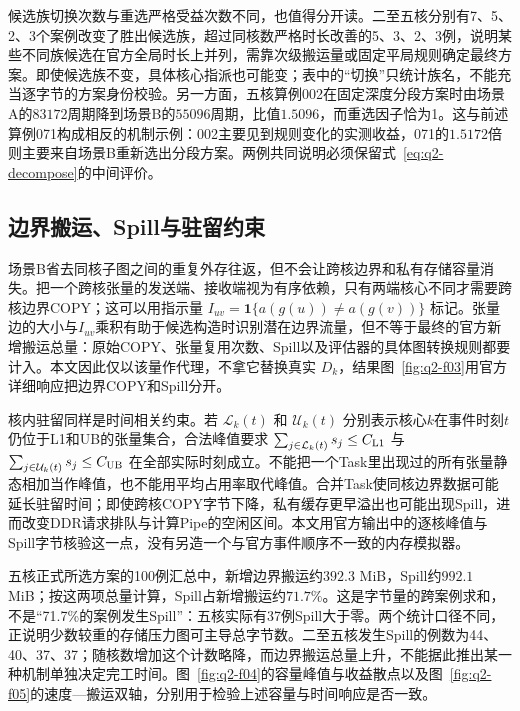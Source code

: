

候选族切换次数与重选严格受益次数不同，也值得分开读。二至五核分别有7、5、2、3个案例改变了胜出候选族，超过同核数严格时长改善的5、3、2、3例，说明某些不同族候选在官方全局时长上并列，需靠次级搬运量或固定平局规则确定最终方案。即使候选族不变，具体核心指派也可能变；表中的“切换”只统计族名，不能充当逐字节的方案身份校验。另一方面，五核算例002在固定深度分段方案时由场景A的$83172$周期降到场景B的$55096$周期，比值$1.5096$，而重选因子恰为1。这与前述算例071构成相反的机制示例：002主要见到规则变化的实测收益，071的$1.5172$倍则主要来自场景B重新选出分段方案。两例共同说明必须保留式~\eqref{eq:q2-decompose}的中间评价。

\subsection{边界搬运、Spill与驻留约束}

场景B省去同核子图之间的重复外存往返，但不会让跨核边界和私有存储容量消失。把一个跨核张量的发送端、接收端视为有序依赖，只有两端核心不同才需要跨核边界COPY；这可以用指示量 $I_{uv}=\mathbf 1\{a(g(u))\ne a(g(v))\}$ 标记。张量边的大小与$I_{uv}$乘积有助于候选构造时识别潜在边界流量，但不等于最终的官方新增搬运总量：原始COPY、张量复用次数、Spill以及评估器的具体图转换规则都要计入。本文因此仅以该量作代理，不拿它替换真实 $D_k$，结果图~\ref{fig:q2-f03}用官方详细响应把边界COPY和Spill分开。

核内驻留同样是时间相关约束。若 $\mathcal L_k(t)$ 和 $\mathcal U_k(t)$ 分别表示核心$k$在事件时刻$t$仍位于L1和UB的张量集合，合法峰值要求 $\sum_{j\in\mathcal L_k(t)}s_j\leq C_{\rm L1}$ 与 $\sum_{j\in\mathcal U_k(t)}s_j\leq C_{\rm UB}$ 在全部实际时刻成立。不能把一个Task里出现过的所有张量静态相加当作峰值，也不能用平均占用率取代峰值。合并Task使同核边界数据可能延长驻留时间；即使跨核COPY字节下降，私有缓存更早溢出也可能出现Spill，进而改变DDR请求排队与计算Pipe的空闲区间。本文用官方输出中的逐核峰值与Spill字节核验这一点，没有另造一个与官方事件顺序不一致的内存模拟器。

五核正式所选方案的100例汇总中，新增边界搬运约$392.3$ MiB，Spill约$992.1$ MiB；按这两项总量计算，Spill占新增搬运约$71.7\%$。这是字节量的跨案例求和，不是“71.7\%的案例发生Spill”：五核实际有37例Spill大于零。两个统计口径不同，正说明少数较重的存储压力图可主导总字节数。二至五核发生Spill的例数为44、40、37、37；随核数增加这个计数略降，而边界搬运总量上升，不能据此推出某一种机制单独决定完工时间。图~\ref{fig:q2-f04}的容量峰值与收益散点以及图~\ref{fig:q2-f05}的速度—搬运双轴，分别用于检验上述容量与时间响应是否一致。

